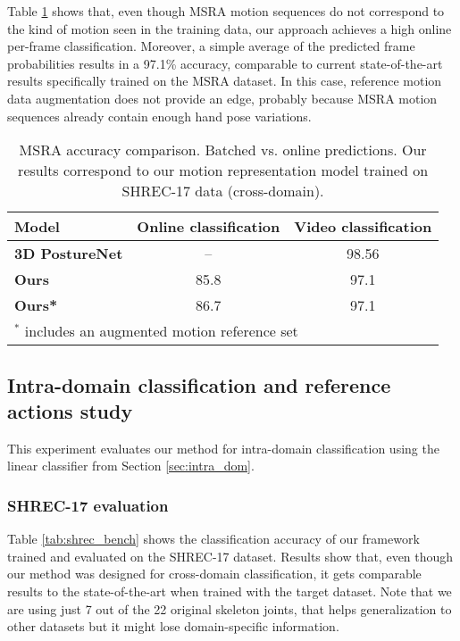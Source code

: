 \documentclass[letterpaper, 10 pt, conference]{ieeeconf}
\begin{document}
Table \ref{tab:msra_bench} shows that, even though MSRA motion sequences do not correspond to the kind of motion seen in the training data, our approach achieves a high online per-frame classification.
Moreover, a simple average of the predicted frame probabilities results in a 97.1\% accuracy, comparable to current state-of-the-art results specifically trained on the MSRA dataset.
In this case, reference motion data augmentation does not provide an edge, probably because MSRA motion sequences already contain enough hand pose variations.

\begin{table}[!tb]
    \centering
\begin{tabular}{|l|c|c|}
\hline
\textbf{Model} & \textbf{Online classification} & \multicolumn{1}{l|}{\textbf{Video classification}} \\ \hline
\textbf{3D PostureNet \cite{liu20203d}} & -- & 98.56 \\ \hline
\textbf{Ours} & 85.8 & 97.1 \\ \hline
\textbf{Ours*} & 86.7 & 97.1 \\ \hline
\multicolumn{3}{l}{\footnotesize \(^*\) includes an augmented motion reference set} \\
\end{tabular}
    \caption{MSRA accuracy comparison. Batched vs. online predictions. Our results correspond to our motion representation model trained on SHREC-17 data (cross-domain).}
    \label{tab:msra_bench}
\end{table}


\subsection{Intra-domain classification and reference actions study}
\label{sec:intra-dom-res}
This experiment evaluates our method for intra-domain classification using the linear classifier from Section \ref{sec:intra_dom}. 

\subsubsection{SHREC-17 evaluation}

Table \ref{tab:shrec_bench} shows the classification accuracy of our framework trained and evaluated on the SHREC-17 dataset.
Results show that, even though our method was designed for cross-domain classification, it gets comparable results to the state-of-the-art when trained with the target dataset. Note that we are using just 7 out of the 22 original skeleton joints, that helps generalization to other datasets but it might lose domain-specific information.
\end{document}
